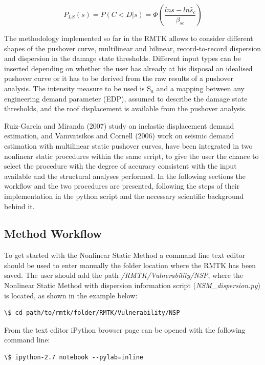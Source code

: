 \begin{equation}
P_{LS}(s) = P(C < D | s) = \Phi(\frac{ln s -ln \hat{s}_c}{\beta_{sc}})
\end{equation}

The methodology implemented so far in the RMTK allows to consider different shapes of the pushover curve, multilinear and bilinear, record-to-record dispersion and dispersion in the damage state thresholds. Different input types can be inserted depending on whether the user has already at his disposal an idealised pushover curve or it has to be derived from the raw results of a pushover analysis. The intensity measure to be used is S$_a$ and a mapping between any engineering demand parameter (EDP), assumed to describe the damage state thresholds, and the roof displacement is available from the pushover analysis.

Ruiz-Garcia and Miranda (2007) study on inelastic displacement demand estimation, and Vamvatsikos and Cornell (2006) work on seismic demand estimation with multilinear static pushover curves, have been integrated in two nonlinear static procedures within the same script, to give the user the chance to select the procedure with the degree of accuracy consistent with the input available and the structural analyses performed. In the following sections the workflow and the two procedures are presented, following the steps of their implementation in the python script and the necessary scientific background behind it.

\subsection{Method Workflow}
To get started with the Nonlinear Static Method a command line text editor should be used to enter manually the folder location where the RMTK has been saved. The user should add the path \textit{/RMTK/Vulnerability/NSP}, where the Nonlinear Static Method with dispersion information script (\textit{NSM\_dispersion.py}) is located, as shown in the example below:

\begin{Verbatim}[frame=single, commandchars=\\\{\}, samepage=true]
\$ cd path/to/rmtk/folder/RMTK/Vulnerability/NSP
\end{Verbatim}

From the text editor iPython browser page can be opened with the following command line:

\begin{Verbatim}[frame=single, commandchars=\\\{\}, samepage=true]
\$ ipython-2.7 notebook --pylab=inline
\end{Verbatim}


